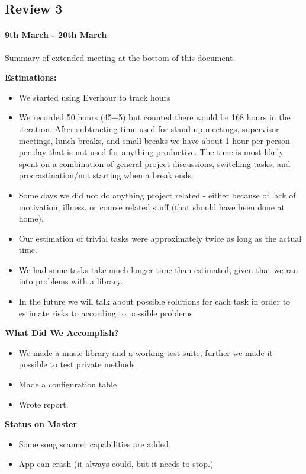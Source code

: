 \subsection{Review 3}
\paragraph{9th March - 20th March}


Summary of extended meeting at the bottom of this document.

\textbf{Estimations:}
\begin{itemize}
\item We started using Everhour to track hours
\item We recorded 50 hours (45+5) but counted there would be 168 hours in the iteration. After subtracting time used for stand-up meetings, supervisor meetings, lunch breaks, and small breaks we have about 1 hour per person per day that is not used for anything productive. The time is most likely spent on a combination of general project discussions, switching tasks, and procrastination/not starting when a break ends.
\item Some days we did not do anything project related - either because of lack of motivation, illness, or course related stuff (that should have been done at home).
\item Our estimation of trivial tasks were approximately twice as long as the actual time.
\item We had some tasks take much longer time than estimated, given that we ran into problems with a library.
\item In the future we will talk about possible solutions for each task in order to estimate risks to according to possible problems.
\end{itemize}

\textbf{What Did We Accomplish?}
\begin{itemize}
\item We made a music library and a working test suite, further we made it possible to test private methods.
\item Made a configuration table  
\item Wrote report.
\end{itemize}


\textbf{Status on Master}
\begin{itemize}
\item Some song scanner capabilities are added.
\item App can crash (it always could, but it needs to stop.)
\end{itemize}


